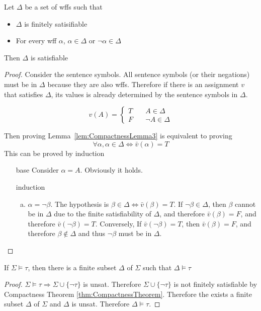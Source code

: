 \begin{lemma}
    \label{lem:CompactnessLemma3}
    Let $\Delta$ be a set of wffs such that
    \begin{itemize}
        \item $\Delta$ is finitely satisifiable
        \item For every wff $\alpha$, $\alpha\in\Delta$ or $\neg\alpha\in\Delta$
    \end{itemize}
    Then $\Delta$ is satisfiable
\end{lemma}
\begin{proof}
    Consider the sentence symbols. All sentence symbols (or their negations) must be in $\Delta$ because they are also wffs. Therefore if there is an assignment $v$ that satisfies $\Delta$, its values is already determined by the sentence symbols in $\Delta$.

    \[v(A)=\begin{cases}
        T &\quad A\in\Delta\\
        F &\quad \neg A\in\Delta
    \end{cases}\]

    Then proving Lemma~\ref{lem:CompactnessLemma3} is equivalent to proving
    \[ \forall \alpha, \alpha\in\Delta\Leftrightarrow\bar{v}(\alpha) = T \]
    This can be proved by induction
    \begin{itemize}
        \item[base] Consider $\alpha=A$. Obviously it holds.
        \item[induction] \begin{enumerate}[(a)]
            \item $\alpha=\neg\beta$. The hypothesis is $\beta\in\Delta \Leftrightarrow \bar{v}(\beta)=T$. If $\neg\beta\in\Delta$, then $\beta$ cannot be in $\Delta$ due to the finite satisfiability of $\Delta$, and therefore $\bar{v}(\beta) = F$, and therefore $\bar{v}(\neg\beta) = T$. Conversely, If $\bar{v}(\neg\beta) = T$, then $\bar{v}(\beta) =F$, and therefore $\beta\notin\Delta$ and thus $\neg\beta$ must be in $\Delta$.
        \end{enumerate}
    \end{itemize}
\end{proof}

\begin{corollary}
    \label{coroll:CorollaryOfTheCompactnessTheorem}
    If $\Sigma\vDash\tau$, then there is a finite subset $\Delta$ of $\Sigma$ such that $\Delta\vDash\tau$
\end{corollary}
\begin{proof}
    $\Sigma\vDash\tau\Rightarrow\Sigma\cup\{\neg\tau\}$ is unsat. Therefore $\Sigma\cup\{\neg\tau\}$ is not finitely satisfiable by Compactness Theorem \ref{thm:CompactnessTheorem}. Therefore the exists a finite subset $\Delta$ of $\Sigma$ and $\Delta$ is unsat. Therefore $\Delta\vDash\tau$.
\end{proof}

